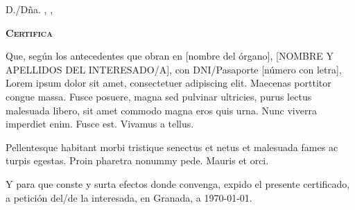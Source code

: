 \documentclass[marcaagua]{UGR-generico}
\begin{document}
\hfill\vfill
\begin{bfseries}
  D./Dña. \printNombre, \printCargo, \printDepartamento
\end{bfseries}
\bigskip

\begin{center}
  \bfseries\scshape\large
  Certifica
\end{center}
\bigskip

Que, según los antecedentes que obran en [nombre del órgano], [NOMBRE Y APELLIDOS DEL INTERESADO/A], con DNI/Pasaporte [número con letra], Lorem ipsum dolor sit amet, consectetuer adipiscing elit. Maecenas porttitor congue massa. Fusce posuere, magna sed pulvinar ultricies, purus lectus malesuada libero, sit amet commodo magna eros quis urna.
Nunc viverra imperdiet enim. Fusce est. Vivamus a tellus.

Pellentesque habitant morbi tristique senectus et netus et malesuada fames ac turpis egestas. Proin pharetra nonummy pede. Mauris et orci.

Y para que conste y surta efectos donde convenga, expido el presente certificado, a petición del/de la interesada, en Granada, a \today.

\vfill\vfill
\begin{center}


  \begin{bfseries}
    \printNombre\\
    \printCargo
  \end{bfseries}
\end{center}
\vfill



\end{document}
